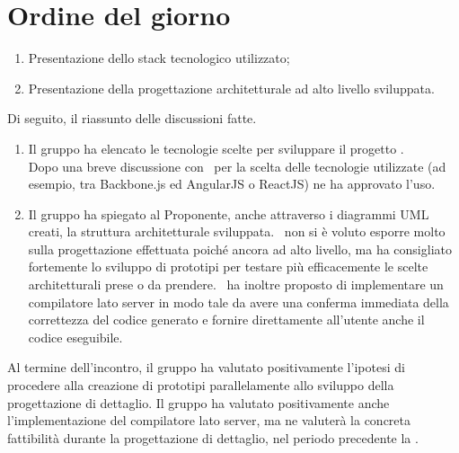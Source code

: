 \documentclass[../AnalisiDeiRequisiti.tex]{subfiles}
\begin{document}
	\section*{Ordine del giorno}
		\begin{enumerate}
			\item Presentazione dello stack tecnologico utilizzato;
			\item Presentazione della progettazione architetturale ad alto livello sviluppata.
		\end{enumerate}
		Di seguito, il riassunto delle discussioni fatte.
		\begin{enumerate}
		\item
		Il gruppo ha elencato le tecnologie scelte per sviluppare il progetto \progetto.\\
		Dopo una breve discussione con \proponente\ per la scelta delle tecnologie utilizzate (ad esempio,
		tra Backbone.js ed AngularJS o ReactJS) ne ha approvato l'uso.
		\item
		Il gruppo ha spiegato al Proponente, anche attraverso i diagrammi UML creati, la struttura
		architetturale sviluppata. \proponente\ non si è voluto esporre molto sulla progettazione
		effettuata poiché ancora ad alto livello, ma ha consigliato fortemente lo sviluppo di prototipi
		per testare più efficacemente le scelte architetturali prese o da prendere.	
		\proponente\ ha inoltre proposto di implementare un compilatore lato server in modo tale da avere
		una conferma immediata della correttezza del codice generato e fornire direttamente all'utente
		anche il codice eseguibile.
		\end{enumerate}
		Al termine dell'incontro, il gruppo ha valutato positivamente l'ipotesi di procedere alla
		creazione di prototipi parallelamente allo sviluppo della progettazione di dettaglio.
		Il gruppo ha valutato positivamente anche l'implementazione del compilatore lato server, ma
		ne valuterà la concreta fattibilità durante la progettazione di dettaglio, nel periodo precedente
		la \revisionediqualifica.
\end{document}
